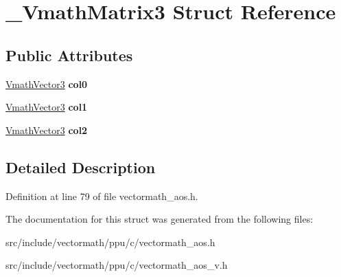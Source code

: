 \hypertarget{struct__VmathMatrix3}{\section{\-\_\-\-Vmath\-Matrix3 Struct Reference}
\label{struct__VmathMatrix3}
}
\subsection*{Public Attributes}
\begin{DoxyCompactItemize}
\item 
\hypertarget{struct__VmathMatrix3_a2920e9eb5da6c99b5620f3ecd2f83e71}{\hyperlink{struct__VmathVector3}{Vmath\-Vector3} {\bfseries col0}}\label{struct__VmathMatrix3_a2920e9eb5da6c99b5620f3ecd2f83e71}

\item 
\hypertarget{struct__VmathMatrix3_af8e736078a6351bd5b20f6f55864f373}{\hyperlink{struct__VmathVector3}{Vmath\-Vector3} {\bfseries col1}}\label{struct__VmathMatrix3_af8e736078a6351bd5b20f6f55864f373}

\item 
\hypertarget{struct__VmathMatrix3_aa5e81c0a4d79f8e6bb576f89ee2eef81}{\hyperlink{struct__VmathVector3}{Vmath\-Vector3} {\bfseries col2}}\label{struct__VmathMatrix3_aa5e81c0a4d79f8e6bb576f89ee2eef81}

\end{DoxyCompactItemize}


\subsection{Detailed Description}


Definition at line 79 of file vectormath\-\_\-aos.\-h.



The documentation for this struct was generated from the following files\-:\begin{DoxyCompactItemize}
\item 
src/include/vectormath/ppu/c/vectormath\-\_\-aos.\-h\item 
src/include/vectormath/ppu/c/vectormath\-\_\-aos\-\_\-v.\-h\end{DoxyCompactItemize}
